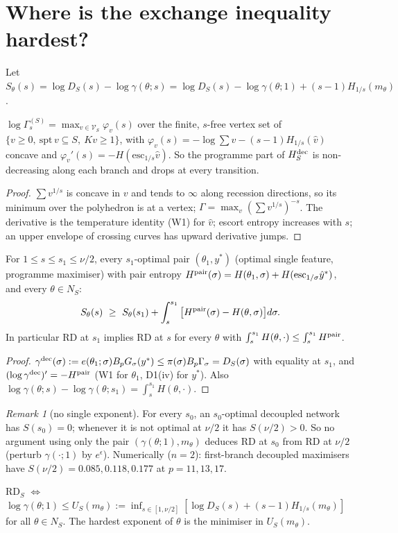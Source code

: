 \documentclass[11pt]{article}
\theoremstyle{remark}\newtheorem{remark}[theorem]{Remark}
\begin{document}
\section{Where is the exchange inequality hardest?}
Let $S_\theta(s)=\log D_S(s)-\log\gamma(\theta;s)=\log D_S(s)-\log\gamma(\theta;1)+(s-1)H_{1/s}(m_\theta)$.
\begin{proposition} $\log\Gamma^{(S)}_s=\max_{v\in\mathcal V_S}\varphi_v(s)$ over the finite, $s$-free vertex set of
$\{v\ge0,\ \mathrm{spt}\,v\subseteq S,\ Kv\ge1\}$, with $\varphi_v(s)=-\log\sum v-(s-1)H_{1/s}(\hat v)$ concave and $\varphi_v'(s)=-H(\mathrm{esc}_{1/s}\hat v)$.
So the programme part of $H^{\rm dec}_S$ is non-decreasing along each branch and drops at every transition.\end{proposition}
\begin{proof} $\sum v^{1/s}$ is concave in $v$ and tends to $\infty$ along recession directions, so its minimum over the polyhedron is at a vertex;
$\Gamma=\max_v(\sum v^{1/s})^{-s}$. The derivative is the temperature identity (W1) for $\hat v$; escort entropy increases with $s$; an upper envelope of
crossing curves has upward derivative jumps.\end{proof}
\begin{proposition} For $1\le s\le s_1\le\nu/2$, every $s_1$-optimal pair $(\theta_1,y^*)$ (optimal single feature, programme maximiser)
with pair entropy $H^{\rm pair}(\sigma)=H(\theta_1,\sigma)+H(\mathrm{esc}_{1/\sigma}\hat y^*)$, and every $\theta\in N_S$:
\[S_\theta(s)\ \ge\ S_\theta(s_1)+\int_s^{s_1}\big[H^{\rm pair}(\sigma)-H(\theta,\sigma)\big]d\sigma .\]
In particular RD at $s_1$ implies RD at $s$ for every $\theta$ with $\int_s^{s_1}H(\theta,\cdot)\le\int_s^{s_1}H^{\rm pair}$.\end{proposition}
\begin{proof} $\gamma^{\rm dec}(\sigma):=e(\theta_1;\sigma)B_pG_\sigma(y^*)\le\pi(\sigma)B_p\Gamma_\sigma=D_S(\sigma)$ with equality at $s_1$, and
$(\log\gamma^{\rm dec})'=-H^{\rm pair}$ (W1 for $\theta_1$, D1(iv) for $y^*$). Also $\log\gamma(\theta;s)-\log\gamma(\theta;s_1)=\int_s^{s_1}H(\theta,\cdot)$.\end{proof}
\begin{remark}[no single exponent] For every $s_0$, an $s_0$-optimal decoupled network has $S(s_0)=0$; whenever it is not optimal at $\nu/2$ it has
$S(\nu/2)>0$. So no argument using only the pair $(\gamma(\theta;1),m_\theta)$ deduces RD at $s_0$ from RD at $\nu/2$ (perturb $\gamma(\cdot;1)$ by $e^{\epsilon}$).
Numerically ($n=2$): first-branch decoupled maximisers have $S(\nu/2)=0.085,0.118,0.177$ at $p=11,13,17$.\end{remark}
\begin{proposition} RD$_S$ $\iff$ $\log\gamma(\theta;1)\le U_S(m_\theta):=\inf_{s\in[1,\nu/2]}[\log D_S(s)+(s-1)H_{1/s}(m_\theta)]$ for all $\theta\in N_S$.
The hardest exponent of $\theta$ is the minimiser in $U_S(m_\theta)$.\end{proposition}
\end{document}
